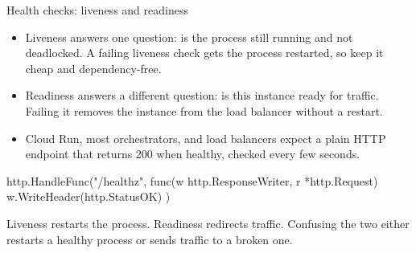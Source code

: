 \documentclass[10pt,aspectratio=169,t]{beamer}
\begin{document}
\begin{frame}[fragile,eyebrow=Deploying]{Health checks: liveness and readiness}
  \vskip 1mm
  \begin{itemize}
    \item Liveness answers one question: is the process still running and not deadlocked. A failing liveness check gets the process restarted, so keep it cheap and dependency-free.
    \item Readiness answers a different question: is this instance ready for traffic. Failing it removes the instance from the load balancer without a restart.
    \item Cloud Run, most orchestrators, and load balancers expect a plain HTTP endpoint that returns 200 when healthy, checked every few seconds.
  \end{itemize}
\begin{golang}
http.HandleFunc("/healthz", func(w http.ResponseWriter, r *http.Request) {
    w.WriteHeader(http.StatusOK)
})
\end{golang}
  \begin{takeaway}{Liveness restarts the process. Readiness redirects traffic.}
    Confusing the two either restarts a healthy process or sends traffic to a broken one.
  \end{takeaway}
\end{frame}
\end{document}
